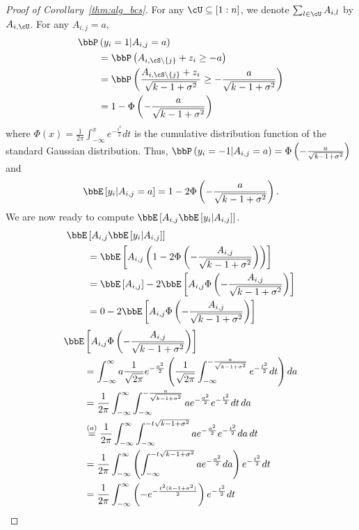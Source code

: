 \begin{proof}[Proof of Corollary~\ref{thm:alg_bcs}]
For any $\cU\subseteq[1:n]$, we denote $\sum_{l \in \cU}A_{i,l}$ by $A_{i,\cU}$.  For any $A_{i,j} = a$, 
\begin{align*}
\bbP&\inp{y_i = 1|A_{i,j} = a} \\
&= \bbP\inp{A_{i,\cS\setminus\inb{j}}+z_i\geq -a} \\
& = \bbP\inp{\frac{A_{i,\cS\setminus\inb{j}}+z_i}{\sqrt{k-1+\sigma^2}}\geq -\frac{a}{\sqrt{k-1+\sigma^2}}}\\
& = 1-\Phi\inp{-\frac{a}{\sqrt{k-1+\sigma^2}}}
\end{align*} where $\Phi(x) = \frac{1}{2\pi}\int_{-\infty}^{x}e^{-\frac{t^2}{2}}dt$ is the cumulative distribution function of the standard Gaussian distribution. Thus, 
$\bbP\inp{y_i = -1|A_{i,j} = a}  = \Phi\inp{-\frac{a}{\sqrt{k-1+\sigma^2}}}$ and 
$$\bbE\insq{y_i| A_{i,j}=a} = 1-2\Phi\inp{-\frac{a}{\sqrt{k-1+\sigma^2}}}.$$ We are now ready to compute $\bbE\insq{ A_{i,j}\bbE\insq{y_i| A_{i,j}}}$.
\begin{align}
\bbE&\insq{ A_{i,j}\bbE\insq{y_i| A_{i,j}}} \nonumber\\
&= \bbE\insq{ A_{i,j}\inp{1-2\Phi\inp{-\frac{A_{i,j}}{\sqrt{k-1+\sigma^2}}}}}\nonumber\\
&= \bbE\insq{ A_{i,j}}-2\bbE\insq{A_{i,j}\Phi\inp{-\frac{A_{i,j}}{\sqrt{k-1+\sigma^2}}}}\nonumber\\
&= 0-2\bbE\insq{A_{i,j}\Phi\inp{-\frac{A_{i,j}}{\sqrt{k-1+\sigma^2}}}}\label{eq:expt2}
\end{align}
\begin{align}
\bbE&\insq{A_{i,j}\Phi\inp{-\frac{A_{i,j}}{\sqrt{k-1+\sigma^2}}}}\nonumber\\
& = \int_{-\infty}^{\infty}a\frac{1}{\sqrt{2\pi}}e^{-\frac{a^2}{2}}\inp{\frac{1}{\sqrt{2\pi}}\int_{-\infty}^{-\frac{a}{\sqrt{k-1+\sigma^2}}}e^{-\frac{t^2}{2}}dt}da\nonumber\\
& = \frac{1}{2\pi}\int_{-\infty}^{\infty}\int_{-\infty}^{-\frac{a}{\sqrt{k-1+\sigma^2}}}ae^{-\frac{a^2}{2}}e^{-\frac{t^2}{2}}dt\,da\nonumber\\
& \stackrel{(a)}{=} \frac{1}{2\pi}\int_{-\infty}^{\infty}\int_{-\infty}^{-{t}{\sqrt{k-1+\sigma^2}}}ae^{-\frac{a^2}{2}}e^{-\frac{t^2}{2}}da\,dt\nonumber\\
& =\frac{1}{2\pi}\int_{-\infty}^{\infty}\inp{\int_{-\infty}^{-{t}{\sqrt{k-1+\sigma^2}}}ae^{-\frac{a^2}{2}}da}e^{-\frac{t^2}{2}}dt\nonumber\\
& = \frac{1}{2\pi}\int_{-\infty}^{\infty}\inp{-e^{-\frac{t^2(k-1+\sigma^2)}{2}}}e^{-\frac{t^2}{2}}dt\nonumber\\

\end{align}
\end{proof}
